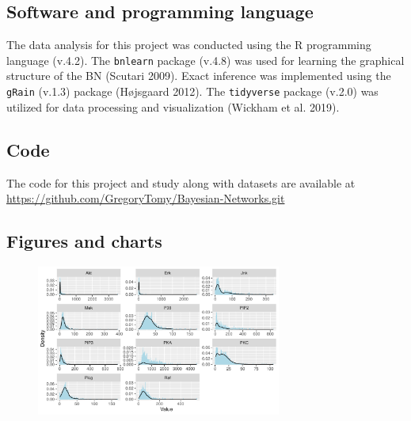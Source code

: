 \documentclass[twocol]{ametsoc}
\begin{document}
\appendix

\hypertarget{software-and-programming-language}{%
\subsection{Software and programming
language}\label{software-and-programming-language}}

The data analysis for this project was conducted using the R programming
language (v.4.2). The \texttt{bnlearn} package (v.4.8) was used for
learning the graphical structure of the BN (Scutari 2009). Exact
inference was implemented using the \texttt{gRain} (v.1.3) package
(Højsgaard 2012). The \texttt{tidyverse} package (v.2.0) was utilized
for data processing and visualization (Wickham et al. 2019).

\hypertarget{code}{%
\subsection{Code}\label{code}}

The code for this project and study along with datasets are available at
\url{https://github.com/GregoryTomy/Bayesian-Networks.git}

\hypertarget{figures-and-charts}{%
\subsection{Figures and charts}\label{figures-and-charts}}

\begin{figure}[h]
\centerline{\includegraphics[width = 19pc]{images/molecule_skews.pdf}}
\end{figure}
\end{document}
